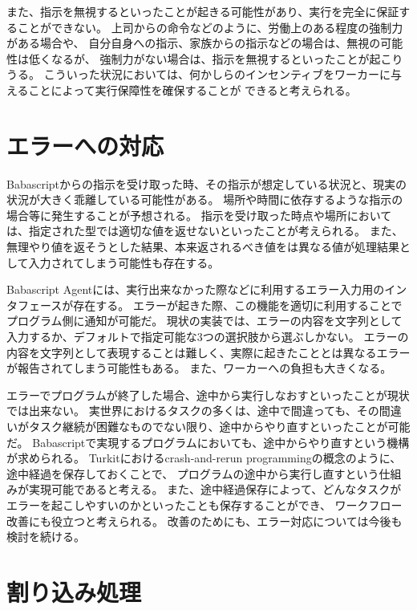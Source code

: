 また、指示を無視するといったことが起きる可能性があり、実行を完全に保証することができない。
上司からの命令などのように、労働上のある程度の強制力がある場合や、
自分自身への指示、家族からの指示などの場合は、無視の可能性は低くなるが、
強制力がない場合は、指示を無視するといったことが起こりうる。
こういった状況においては、何かしらのインセンティブをワーカーに与えることによって実行保障性を確保することが
できると考えられる。

\section{エラーへの対応}\label{ux30a8ux30e9ux30fcux3078ux306eux5bfeux5fdc}

Babascriptからの指示を受け取った時、その指示が想定している状況と、現実の状況が大きく乖離している可能性がある。
場所や時間に依存するような指示の場合等に発生することが予想される。
指示を受け取った時点や場所においては、指定された型では適切な値を返せないといったことが考えられる。
また、無理やり値を返そうとした結果、本来返されるべき値をは異なる値が処理結果として入力されてしまう可能性も存在する。

Babascript
Agentには、実行出来なかった際などに利用するエラー入力用のインタフェースが存在する。
エラーが起きた際、この機能を適切に利用することでプログラム側に通知が可能だ。
現状の実装では、エラーの内容を文字列として入力するか、デフォルトで指定可能な3つの選択肢から選ぶしかない。
エラーの内容を文字列として表現することは難しく、実際に起きたこととは異なるエラーが報告されてしまう可能性もある。
また、ワーカーへの負担も大きくなる。

エラーでプログラムが終了した場合、途中から実行しなおすといったことが現状では出来ない。
実世界におけるタスクの多くは、途中で間違っても、その間違いがタスク継続が困難なものでない限り、途中からやり直すといったことが可能だ。
Babascriptで実現するプログラムにおいても、途中からやり直すという機構が求められる。
Turkit\cite{turkit}におけるcrash-and-rerun
programmingの概念のように、途中経過を保存しておくことで、
プログラムの途中から実行し直すという仕組みが実現可能であると考える。
また、途中経過保存によって、どんなタスクがエラーを起こしやすいのかといったことも保存することができ、
ワークフロー改善にも役立つと考えられる。
改善のためにも、エラー対応については今後も検討を続ける。

\section{割り込み処理}\label{ux5272ux308aux8fbcux307fux51e6ux7406}

